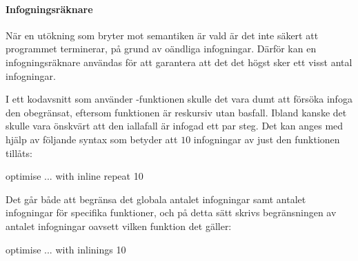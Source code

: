 \documentclass[../Optimise]{subfiles}
\begin{document}
\paragraph{Infogningsräknare}
När en utökning som bryter mot semantiken är vald är det inte säkert
att programmet terminerar, på grund av oändliga infogningar. 
Därför kan en infogningsräknare användas för att garantera
att det det högst sker ett visst antal infogningar.


I ett kodavsnitt som använder -funktionen skulle det vara dumt att
försöka infoga den obegränsat, eftersom funktionen är reskursiv utan basfall.
Ibland kanske det skulle vara önskvärt att den iallafall är infogad ett par steg.
Det kan anges med hjälp av följande syntax som betyder att
$10$ infogningar av just den funktionen tillåts:

\begin{codeEx}
optimise ... with { inline repeat 10 }
\end{codeEx}

Det går både att begränsa det globala antalet infogningar samt antalet infogningar för specifika funktioner, och på detta sätt skrivs begränsningen av antalet infogningar oavsett vilken funktion det gäller:

\begin{codeEx}
optimise ... with { inlinings 10 }
\end{codeEx}
\end{document}
